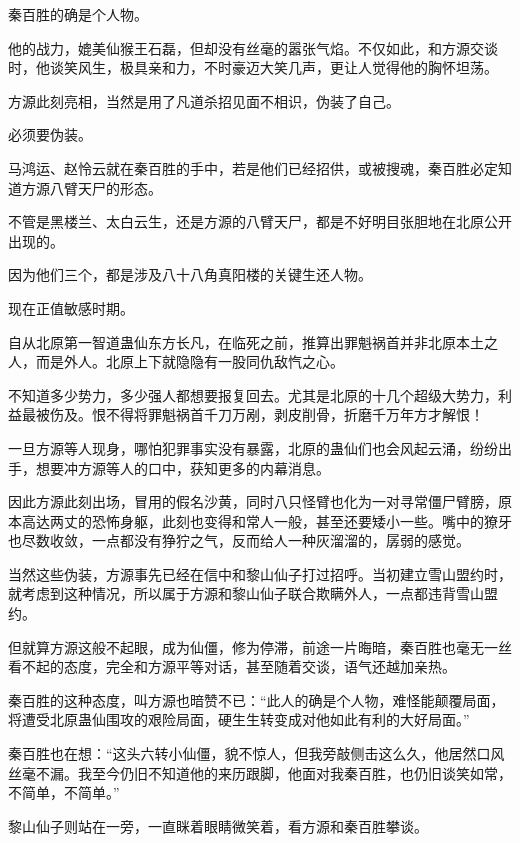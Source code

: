 
\begin{this_body}

秦百胜的确是个人物。

他的战力，媲美仙猴王石磊，但却没有丝毫的嚣张气焰。不仅如此，和方源交谈时，他谈笑风生，极具亲和力，不时豪迈大笑几声，更让人觉得他的胸怀坦荡。

方源此刻亮相，当然是用了凡道杀招见面不相识，伪装了自己。

必须要伪装。

马鸿运、赵怜云就在秦百胜的手中，若是他们已经招供，或被搜魂，秦百胜必定知道方源八臂天尸的形态。

不管是黑楼兰、太白云生，还是方源的八臂天尸，都是不好明目张胆地在北原公开出现的。

因为他们三个，都是涉及八十八角真阳楼的关键生还人物。

现在正值敏感时期。

自从北原第一智道蛊仙东方长凡，在临死之前，推算出罪魁祸首并非北原本土之人，而是外人。北原上下就隐隐有一股同仇敌忾之心。

不知道多少势力，多少强人都想要报复回去。尤其是北原的十几个超级大势力，利益最被伤及。恨不得将罪魁祸首千刀万剐，剥皮削骨，折磨千万年方才解恨！

一旦方源等人现身，哪怕犯罪事实没有暴露，北原的蛊仙们也会风起云涌，纷纷出手，想要冲方源等人的口中，获知更多的内幕消息。

因此方源此刻出场，冒用的假名沙黄，同时八只怪臂也化为一对寻常僵尸臂膀，原本高达两丈的恐怖身躯，此刻也变得和常人一般，甚至还要矮小一些。嘴中的獠牙也尽数收敛，一点都没有狰狞之气，反而给人一种灰溜溜的，孱弱的感觉。

当然这些伪装，方源事先已经在信中和黎山仙子打过招呼。当初建立雪山盟约时，就考虑到这种情况，所以属于方源和黎山仙子联合欺瞒外人，一点都违背雪山盟约。

但就算方源这般不起眼，成为仙僵，修为停滞，前途一片晦暗，秦百胜也毫无一丝看不起的态度，完全和方源平等对话，甚至随着交谈，语气还越加亲热。

秦百胜的这种态度，叫方源也暗赞不已：“此人的确是个人物，难怪能颠覆局面，将遭受北原蛊仙围攻的艰险局面，硬生生转变成对他如此有利的大好局面。”

秦百胜也在想：“这头六转小仙僵，貌不惊人，但我旁敲侧击这么久，他居然口风丝毫不漏。我至今仍旧不知道他的来历跟脚，他面对我秦百胜，也仍旧谈笑如常，不简单，不简单。”

黎山仙子则站在一旁，一直眯着眼睛微笑着，看方源和秦百胜攀谈。


\end{this_body}
